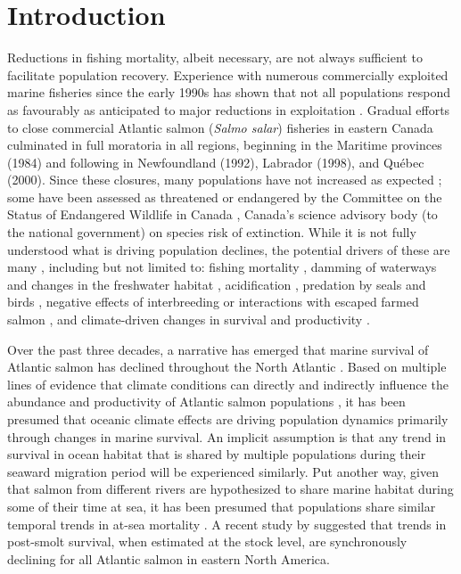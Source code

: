 \documentclass[12pt]{article}
\begin{document}

\section*{Introduction} %


Reductions in fishing mortality, albeit necessary, are not always sufficient
to facilitate population recovery. Experience with numerous commercially
exploited marine fisheries since the early 1990s has shown that not all
populations respond as favourably as anticipated to major reductions in
exploitation \citep{Hutchings2017}. Gradual efforts to close commercial
Atlantic salmon (\emph{Salmo salar}) fisheries in eastern Canada culminated in
full moratoria in all regions, beginning in the Maritime provinces (1984) and
following in Newfoundland (1992), Labrador (1998), and Qu\'{e}bec (2000). Since
these closures, many populations have not increased as 
expected \citep{Dempson2004, ICES2019}; some 
have been assessed as threatened or endangered by the 
Committee on the Status of Endangered Wildlife in Canada \citep[][]{Cosewic2010}, 
Canada's science advisory body (to the national government) on
species risk of extinction.
While it is not fully understood what is driving population declines, the potential
drivers of these are many \citep[see ][for a detailed discussion of possible
causes]{Cairns2001}, including but not limited to: fishing mortality \citep{Dempson2004}, 
damming of waterways and changes in the freshwater habitat \citep{Dunfield1985,Clarke2014a}, acidification
\citep[particularly in the Southern Uplands region of
NS, see][]{Gibson2010}, predation by seals and birds \citep{Cairns2000}, negative
effects of interbreeding or interactions with escaped farmed salmon
\citep{Keyser2018}, and climate-driven changes in survival and productivity \citep{Mills2013}.

Over the past three decades, a narrative has emerged that marine survival of
Atlantic salmon has declined throughout the North Atlantic \citep{ICES2019}.
Based on multiple lines of evidence that climate conditions can directly and
indirectly influence the abundance and productivity of Atlantic salmon
populations \citep{Mills2013,Almodovar2019}, it has been presumed that oceanic climate effects are
driving population dynamics primarily through changes in marine survival.
An implicit assumption is that any trend in
survival in ocean habitat that is shared by multiple populations during their
seaward migration period will be experienced similarly. 
Put another way, given that salmon from different rivers 
are hypothesized to share marine habitat during some of their time at sea, it
has been presumed that populations share similar temporal trends in
at-sea mortality \citep{Friedland1993, Friedland1998, Russell2012}.  
A recent study by \citet{Olmos2019} suggested that trends in post-smolt
survival, when estimated at the stock level, are synchronously declining
for all Atlantic salmon in eastern North America.
\end{document}
